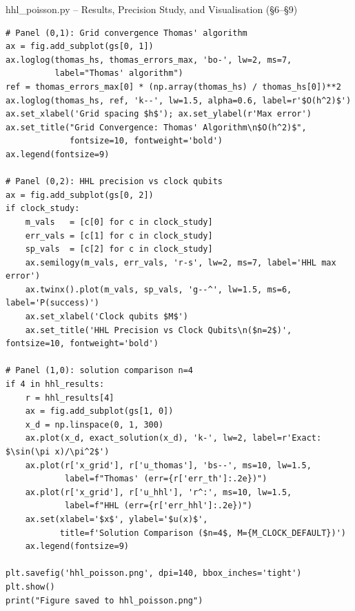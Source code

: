 \documentclass{beamer}
\begin{document}
\begin{frame}{hhl\_poisson.py -- Results, Precision Study, and Visualisation (\S6--\S9)}
\begin{lstlisting}
# Panel (0,1): Grid convergence Thomas' algorithm
ax = fig.add_subplot(gs[0, 1])
ax.loglog(thomas_hs, thomas_errors_max, 'bo-', lw=2, ms=7,
          label="Thomas' algorithm")
ref = thomas_errors_max[0] * (np.array(thomas_hs) / thomas_hs[0])**2
ax.loglog(thomas_hs, ref, 'k--', lw=1.5, alpha=0.6, label=r'$O(h^2)$')
ax.set_xlabel('Grid spacing $h$'); ax.set_ylabel(r'Max error')
ax.set_title("Grid Convergence: Thomas' Algorithm\n$O(h^2)$",
             fontsize=10, fontweight='bold')
ax.legend(fontsize=9)

# Panel (0,2): HHL precision vs clock qubits
ax = fig.add_subplot(gs[0, 2])
if clock_study:
    m_vals   = [c[0] for c in clock_study]
    err_vals = [c[1] for c in clock_study]
    sp_vals  = [c[2] for c in clock_study]
    ax.semilogy(m_vals, err_vals, 'r-s', lw=2, ms=7, label='HHL max error')
    ax.twinx().plot(m_vals, sp_vals, 'g--^', lw=1.5, ms=6, label='P(success)')
    ax.set_xlabel('Clock qubits $M$')
    ax.set_title('HHL Precision vs Clock Qubits\n($n=2$)', fontsize=10, fontweight='bold')

# Panel (1,0): solution comparison n=4
if 4 in hhl_results:
    r = hhl_results[4]
    ax = fig.add_subplot(gs[1, 0])
    x_d = np.linspace(0, 1, 300)
    ax.plot(x_d, exact_solution(x_d), 'k-', lw=2, label=r'Exact: $\sin(\pi x)/\pi^2$')
    ax.plot(r['x_grid'], r['u_thomas'], 'bs--', ms=10, lw=1.5,
            label=f"Thomas' (err={r['err_th']:.2e})")
    ax.plot(r['x_grid'], r['u_hhl'], 'r^:', ms=10, lw=1.5,
            label=f"HHL (err={r['err_hhl']:.2e})")
    ax.set(xlabel='$x$', ylabel='$u(x)$',
           title=f'Solution Comparison ($n=4$, M={M_CLOCK_DEFAULT})')
    ax.legend(fontsize=9)

plt.savefig('hhl_poisson.png', dpi=140, bbox_inches='tight')
plt.show()
print("Figure saved to hhl_poisson.png")
\end{lstlisting}
\end{frame}
\end{document}

